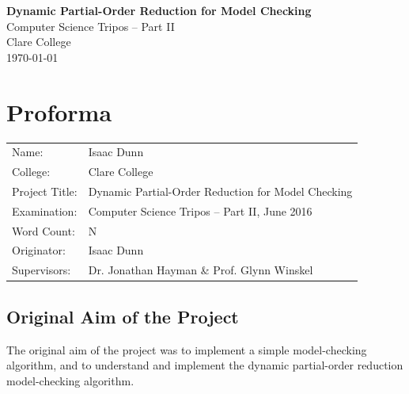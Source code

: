 \documentclass[12pt,a4paper,twoside,openright]{report}
\begin{document}





\pagestyle{empty}


\vspace*{60mm}
\begin{center}
\Huge
\textbf{Dynamic Partial-Order Reduction for Model Checking} \\[7mm]
Computer Science Tripos -- Part II \\[6mm]
Clare College \\[7mm]
\LARGE \today  %
\end{center}


\pagestyle{plain}

\chapter*{Proforma}

{\large
\begin{tabular}{ll}
Name:           &  Isaac Dunn                            			 \\
College:        &  Clare College                    				     \\
Project Title:	&  Dynamic Partial-Order Reduction for Model Checking \\
Examination:    &  Computer Science Tripos -- Part II, June 2016      \\
Word Count:     &  N    												 \\
Originator: &  Isaac Dunn\footnotemark[1] 					 \\
Supervisors:	&  Dr. Jonathan Hayman \& Prof. Glynn Winskel         \\
\end{tabular}
}


\section*{Original Aim of the Project}

The original aim of the project was to implement
a simple model-checking algorithm, and to
understand and implement the dynamic partial-order reduction
model-checking algorithm.
\end{document}
